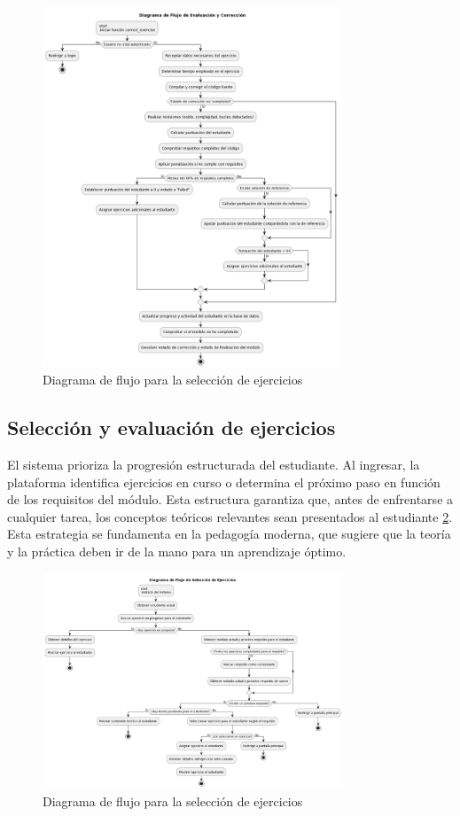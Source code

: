 \begin{figure}[H]
    \centering
    \includegraphics[width=0.8\textwidth]{imagenes/correcionejercicios.png}
    \caption{Diagrama de flujo para la selección de ejercicios}
    \label{fig:correccion}
    \end{figure}

\subsection{Selección y evaluación de ejercicios}

El sistema prioriza la progresión estructurada del estudiante. Al ingresar, la plataforma identifica ejercicios en curso o determina el próximo paso en función de los requisitos del módulo. Esta estructura garantiza que, antes de enfrentarse a cualquier tarea, los conceptos teóricos relevantes sean presentados al estudiante \ref{fig:seleccion}. Esta estrategia se fundamenta en la pedagogía moderna, que sugiere que la teoría y la práctica deben ir de la mano para un aprendizaje óptimo.

\begin{figure}[H]
\centering
\includegraphics[width=0.8\textwidth]{imagenes/seleccionejercicios.png}
\caption{Diagrama de flujo para la selección de ejercicios}
\label{fig:seleccion}
\end{figure}

